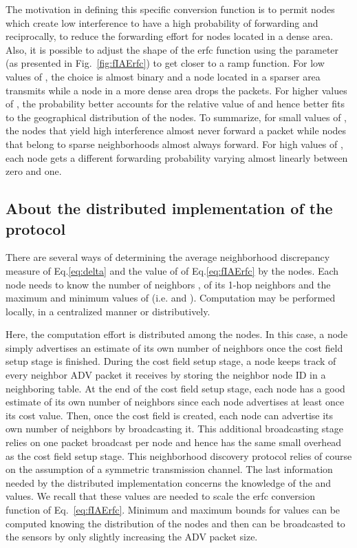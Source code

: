 \documentclass[journal, peerreview, onecolumn, draftcls]{IEEEtran}
\begin{document}
The motivation in defining this specific conversion function is to permit nodes which create low interference to have a high probability of forwarding and reciprocally, to reduce the forwarding effort for nodes located in a dense area. Also, it is possible to adjust the shape of the erfc function using the parameter  (as presented in Fig.~\ref{fig:fIAErfc}) to get closer to a ramp function. For low values of , the choice is almost binary and a node located in a sparser area transmits while a node in a more dense area drops the packets. For higher values of , the probability better accounts for the relative value of  and hence better fits to the geographical distribution of the nodes.
To summarize, for small values of , the nodes that yield high interference almost never forward a packet while nodes that belong to sparse neighborhoods almost always forward. For high values of , each node gets a different forwarding probability varying almost linearly between zero and one.

\subsection{About the distributed implementation of the protocol}

There are several ways of determining the average neighborhood discrepancy measure of Eq.\ref{eq:delta} and the value of  of Eq.\ref{eq:fIAErfc} by the nodes. Each node needs to know the number of neighbors ,  of its 1-hop neighbors and the maximum and minimum values of  (i.e.  and ). Computation may be performed locally, in a centralized manner or distributively.



Here, the computation effort is distributed among the nodes. In this case, a node simply advertises an estimate of its own number of neighbors once the cost field setup stage is finished. During the cost field setup stage, a node keeps track of every neighbor ADV packet it receives by storing the neighbor node ID in a neighboring table. At the end of the cost field setup stage, each node has a good estimate of its own number of neighbors since each node advertises at least once its cost value. Then, once the cost field is created, each node  can advertise its own number of neighbors  by broadcasting it. This additional broadcasting stage relies on one packet broadcast per node and hence has the same small overhead as the cost field setup stage. This neighborhood discovery protocol relies of course on the assumption of a symmetric transmission channel. The last information needed by the distributed implementation concerns the knowledge of the  and  values. We recall that these values are needed to scale the erfc conversion function of Eq.~\eqref{eq:fIAErfc}. Minimum and maximum bounds for  values can be computed knowing the distribution of the nodes and then can be broadcasted to the sensors by only slightly increasing the ADV packet size.
\end{document}
